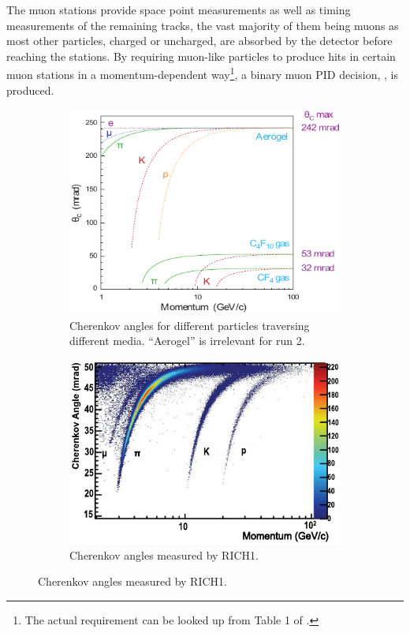 \begin{itemize}
        The muon stations provide space point measurements
        as well as timing measurements of the remaining tracks,
        the vast majority of them being muons as most other particles,
        charged or uncharged,
        are absorbed by the detector before reaching the stations.
        By requiring muon-like particles to produce hits in certain muon
        stations in a momentum-dependent way\footnote{
            The actual requirement can be looked up from Table 1 of
            \cite{LHCB-DP-2013-001}.
        },
        a binary muon PID decision, \isMuon, is produced.
\end{itemize}

\begin{figure}[!htb]
    \centering
    \begin{subfigure}[t]{0.45\textwidth}
        \centering
        \includegraphics[width=\textwidth]{./figs-detector/pid/cherenkov_angle_media.pdf}
        \caption{
            Cherenkov angles for different particles traversing different media.
            ``Aerogel'' is irrelevant for run 2.
        }
    \end{subfigure}
    \hspace{12pt}
    \begin{subfigure}[t]{0.45\textwidth}
        \centering
        \includegraphics[width=\textwidth]{./figs-detector/pid/rich1_measurement.pdf}
        \caption{Cherenkov angles measured by RICH1.}
    \end{subfigure}


\end{figure}
